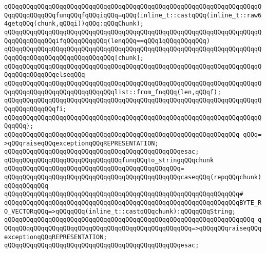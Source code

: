 \newline
\verb|qQQqqQQqqQQqqQQqqQQqqQQqqQQqqQQqqQQqqQQqqQQqqQQqqQQqqQQqqQQqqQQqqQQqqQQqqQQqqQQqqQQqfunqQQqfqQQqiqQQq=qQQq(inline_t::castqQQq(inline_t::raw64getqQQq(chunk,qQQqi))qQQq:qQQqChunk);|\newline
\newline
\verb|qQQqqQQqqQQqqQQqqQQqqQQqqQQqqQQqqQQqqQQqqQQqqQQqqQQqqQQqqQQqqQQqqQQqqQQqqQQqqQQqqQQqifqQQqqQQqqQQq(lenqQQq==qQQq1qQQqqQQqqQQq)|\newline
\verb|qQQqqQQqqQQqqQQqqQQqqQQqqQQqqQQqqQQqqQQqqQQqqQQqqQQqqQQqqQQqqQQqqQQqqQQqqQQqqQQqqQQqqQQqqQQqqQQqqQQq[chunk];|\newline
\verb|qQQqqQQqqQQqqQQqqQQqqQQqqQQqqQQqqQQqqQQqqQQqqQQqqQQqqQQqqQQqqQQqqQQqqQQqqQQqqQQqqQQqelseqQQq|\newline
\verb|qQQqqQQqqQQqqQQqqQQqqQQqqQQqqQQqqQQqqQQqqQQqqQQqqQQqqQQqqQQqqQQqqQQqqQQqqQQqqQQqqQQqqQQqqQQqqQQqqQQqlist::from_fnqQQq(len,qQQqf);|\newline
\verb|qQQqqQQqqQQqqQQqqQQqqQQqqQQqqQQqqQQqqQQqqQQqqQQqqQQqqQQqqQQqqQQqqQQqqQQqqQQqqQQqqQQqfi;|\newline
\verb|qQQqqQQqqQQqqQQqqQQqqQQqqQQqqQQqqQQqqQQqqQQqqQQqqQQqqQQqqQQqqQQqqQQqqQQqqQQq};|\newline
\verb|qQQqqQQqqQQqqQQqqQQqqQQqqQQqqQQqqQQqqQQqqQQqqQQqqQQqqQQqqQQqqQQq_qQQq=>qQQqraiseqQQqexceptionqQQqREPRESENTATION;|\newline
\verb|qQQqqQQqqQQqqQQqqQQqqQQqqQQqqQQqqQQqqQQqqQQqqQQqesac;|\newline
\newline
\verb|qQQqqQQqqQQqqQQqqQQqqQQqqQQqqQQqfunqQQqto_stringqQQqchunk|\newline
\verb|qQQqqQQqqQQqqQQqqQQqqQQqqQQqqQQqqQQqqQQqqQQqqQQq=|\newline
\verb|qQQqqQQqqQQqqQQqqQQqqQQqqQQqqQQqqQQqqQQqqQQqqQQqcaseqQQq(repqQQqchunk)qQQqqQQqqQQq|\newline
\verb|qQQqqQQqqQQqqQQqqQQqqQQqqQQqqQQqqQQqqQQqqQQqqQQqqQQqqQQqqQQqqQQq#|\newline
\verb|qQQqqQQqqQQqqQQqqQQqqQQqqQQqqQQqqQQqqQQqqQQqqQQqqQQqqQQqqQQqqQQqBYTE_RO_VECTORqQQq=>qQQqqQQq(inline_t::castqQQqchunk):qQQqqQQqString;|\newline
\verb|qQQqqQQqqQQqqQQqqQQqqQQqqQQqqQQqqQQqqQQqqQQqqQQqqQQqqQQqqQQqqQQqqQQq_qQQqqQQqqQQqqQQqqQQqqQQqqQQqqQQqqQQqqQQqqQQqqQQqqQQq=>qQQqqQQqraiseqQQqexceptionqQQqREPRESENTATION;|\newline
\verb|qQQqqQQqqQQqqQQqqQQqqQQqqQQqqQQqqQQqqQQqqQQqqQQqesac;|\newline
